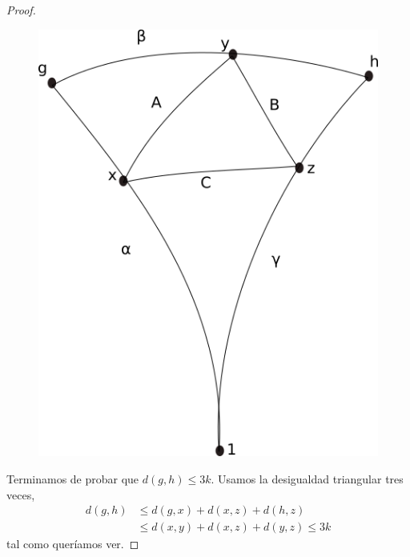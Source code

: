\documentclass[tesis.tex]{subfiles}
\begin{document}
\begin{proof}
	\begin{figure}[H]
		\centering
		\includegraphics[scale=0.5]{treewidth.png}
		\caption*{}
	\end{figure}
	
	
	Terminamos de probar que $d(g,h) \le 3k$. 
	Usamos la desigualdad triangular tres veces,
	\begin{align*}
		d(g,h) & \le d(g,x) + d(x,z) + d(h,z) \\
		& \le d(x,y) + d(x,z) + d(y,z) \le 3k
	\end{align*}
	tal como queríamos ver.
\end{proof}
	
	
\end{document}
